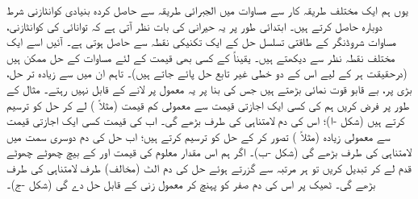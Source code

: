 یوں ہم ایک مختلف طریقہ کار سے مساوات  میں الجبرائی طریقہ سے حاصل کردہ بنیادی کوانٹازنی شرط دوبارہ حاصل کرتے ہیں۔ ابتدائی طور پر یہ حیرانی کی بات نظر آتی ہے کہ توانائی کی کوانٹازنی، مساوات شروڈنگر کے طاقتی تسلسل حل کے ایک تکنیکی نقطہ سے حاصل ہوتی ہے۔ آئیں اسے ایک مختلف نقطہ نظر سے دیکھتے ہیں۔ یقیناً  کے کسی بھی قیمت کے لئے مساوات  کے حل ممکن ہیں (درحقیقت ہر  کے لیے اس کے دو خطی غیر تابع حل پائے جاتے ہیں)۔ تاہم ان میں سے زیادہ تر حل، بڑی  پر، بے قابو قوت نمائی بڑھتے ہیں جس کی بنا پر یہ معمول پر لانے کے قابل نہیں رہتے۔ مثال کے طور پر فرض کریں ہم  کی کسی ایک اجازتی قیمت سے معمولی کم قیمت (مثلاً ) لے کر حل کو ترسیم کرتے ہیں (شکل -ا)؛ اس کی دم لامتناہی کی طرف بڑھے گی۔ اب  کی قیمت کسی ایک اجازتی قیمت سے معمولی زیادہ (مثلاً ) تصور کر کے حل کو ترسیم کرتے ہیں؛ اب حل کی دم دوسری سمت میں لامتناہی کی طرف
 بڑھے گی (شکل -ب)۔ اگر ہم اس مقدار معلوم کی قیمت  اور  کے بیچ چھوٹے چھوٹے قدم لے کر تبدیل کریں تو ہر مرتبہ  سے گزرتے ہوئے حل کی دم الٹ (مخالف) طرف لامتناہی کی طرف بڑھے گی۔ ٹھیک  پر اس کی دم صفر کو پہنچ کر معمول زنی کے قابل حل دے گی (شکل -ج)۔ 

\begin{comment}
the tail flipping figure (Fig 2.6, p67 below) is produced with the octave code (./tex/octave/tailFlipping.m) reproduced below. this code named "tailFlipping.m" produces the data "tailFlipUP.dat" , "tailFlipDN.dat" and "tailFlipNone.dat" which must be placed in the folder "./tex/tables" (as set by "\pgfplotsset{table/search path={./tex/tables},}" in the preamble). Octave must be run independantly to produce this data.

"./tex/octave/tailFlipping.m"
{
vdp = @(t,y) [y(2); (t^2-0.98)*y(1)];
lin=linspace(0,3.75,50);
[t,y] = ode45 (fvdp, lin, [1,0]);
plot(t,y(:,1));

ty=[t,y(:,1)];
save tailFlipUP.dat ty

fvdp = @(t,y) [y(2); (t^2-1.02)*y(1)];
lin=linspace(0,3.75,50);
[t,y] = ode45 (fvdp, lin, [1,0]);
plot(t,y(:,1));

ty=[t,y(:,1)];
save tailFlipDn.dat ty

fvdp = @(t,y) [y(2); (t^2-1)*y(1)];
lin=linspace(0,3.75,50);
[t,y] = ode45 (fvdp, lin, [1,0]);
plot(t,y(:,1));

ty=[t,y(:,1)];
save tailFlipNone.dat ty
}
\end{comment}

